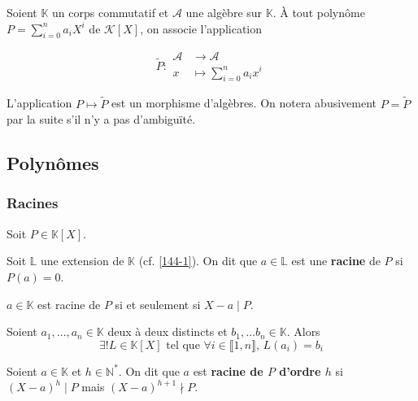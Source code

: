 


	
	Soient $\mathbb{K}$ un corps commutatif et $\mathcal{A}$ une algèbre sur $\mathbb{K}$. À tout polynôme $P = \sum_{i=0}^{n} a_i X^i$ de $\mathcal{K}[X]$, on associe l'application

	\[
	\widetilde{P} :
	\begin{array}{cl}
		\mathcal{A} &\rightarrow \mathcal{A} \\
		x &\mapsto \sum_{i=0}^{n} a_i x^i
	\end{array}
	\]
	
	L'application $P \mapsto \widetilde{P}$ est un morphisme d'algèbres. On notera abusivement $P = \widetilde{P}$ par la suite s'il n'y a pas d'ambiguïté.
	
	\subsection{Polynômes}
	
	\subsubsection{Racines}
	
	Soit $P \in \mathbb{K}[X]$.
	
	
	\begin{definition}
		Soit $\mathbb{L}$ une extension de $\mathbb{K}$ (cf. \cref{144-1}). On dit que $a \in \mathbb{L}$ est une \textbf{racine} de $P$ si $P(a) = 0$.
	\end{definition}
	
	\begin{proposition}
		$a \in \mathbb{K}$ est racine de $P$ si et seulement si $X - a \mid P$. 
	\end{proposition}
	
	\begin{application}
		Soient $a_1, \dots, a_n \in \mathbb{K}$ deux à deux distincts et $b_1, \dots b_n \in \mathbb{K}$. Alors
		\[ \exists! L \in \mathbb{K}[X] \text{ tel que } \forall i \in \llbracket 1, n \rrbracket, \, L(a_i) = b_i \]
	\end{application}
	
	\begin{definition}
		Soient $a \in \mathbb{K}$ et $h \in \mathbb{N}^*$. On dit que $a$ est \textbf{racine de $P$ d'ordre $h$} si $(X-a)^h \mid P$ mais $(X-a)^{h+1} \nmid P$.
	\end{definition}
	
